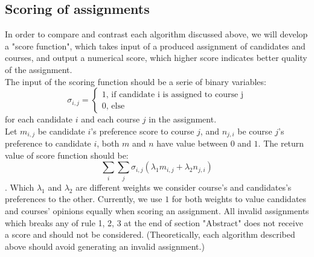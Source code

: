 \documentclass[twoside,twocolumn]{article}
\begin{document}
    \subsection{Scoring of assignments}
    In order to compare and contrast each algorithm discussed above, we will develop a "score function", which takes input
    of a produced assignment of candidates and courses, and output a numerical score, which higher score indicates better
    quality of the assignment.\\
    The input of the scoring function should be a serie of binary variables:
    $$\sigma_{i,j}=\begin{cases}1\text{, if candidate i is assigned to course j} \\
    0\text{, else}\end{cases}$$
    for each candidate $i$ and each course $j$ in the assignment.\\
    Let $m_{i, j}$ be candidate $i$'s preference score to course $j$, and $n_{j, i}$ be course $j$'s preference to candidate $i$,
    both $m$ and $n$ have value between $0$ and $1$. The return value of score function should be:
    $$\sum_i\sum_j \sigma_{i,j}(\lambda_1m_{i,j} + \lambda_2n_{j,i})$$.
    Which $\lambda_1$ and $\lambda_2$ are different weights we consider course's and candidates's preferences to the other. Currently,
    we use $1$ for both weights to value candidates and courses' opinions equally when scoring an assignment.
    All invalid assignments which breaks any of rule 1, 2, 3 at the end of section "Abstract" does not receive a score and should not be
    considered. (Theoretically, each algorithm described above should avoid generating an invalid assignment.)
\end{document}
